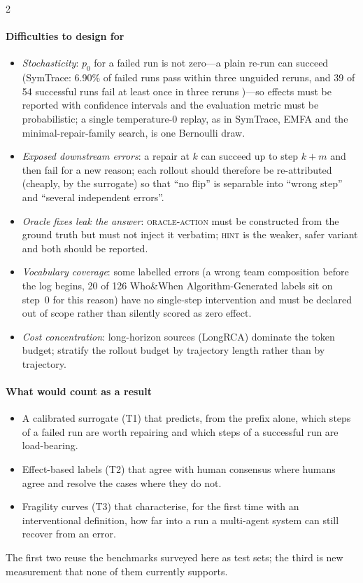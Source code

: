 \begin{multicols}{2}
\paragraph{Difficulties to design for}
\begin{itemize}[leftmargin=1.1em]
\item \emph{Stochasticity}: $p_0$ for a failed run is not zero---a plain re-run can succeed (SymTrace: 6.90\% of failed runs pass within three unguided reruns, and 39 of 54 successful runs fail at least once in three reruns \cite{luan2026symtrace})---so effects must be reported with confidence intervals and the evaluation metric must be probabilistic; a single temperature-0 replay, as in SymTrace, EMFA and the minimal-repair-family search, is one Bernoulli draw.
\item \emph{Exposed downstream errors}: a repair at $k$ can succeed up to step $k+m$ and then fail for a new reason; each rollout should therefore be re-attributed (cheaply, by the surrogate) so that ``no flip'' is separable into ``wrong step'' and ``several independent errors''.
\item \emph{Oracle fixes leak the answer}: \textsc{oracle-action} must be constructed from the ground truth but must not inject it verbatim; \textsc{hint} is the weaker, safer variant and both should be reported.
\item \emph{Vocabulary coverage}: some labelled errors (a wrong team composition before the log begins, 20 of 126 Who\&When Algorithm-Generated labels sit on step~0 for this reason) have no single-step intervention and must be declared out of scope rather than silently scored as zero effect.
\item \emph{Cost concentration}: long-horizon sources (LongRCA) dominate the token budget; stratify the rollout budget by trajectory length rather than by trajectory.
\end{itemize}

\paragraph{What would count as a result}
\begin{itemize}[leftmargin=1.1em]
\item A calibrated surrogate (T1) that predicts, from the prefix alone, which steps of a failed run are worth repairing and which steps of a successful run are load-bearing.
\item Effect-based labels (T2) that agree with human consensus where humans agree and resolve the cases where they do not.
\item Fragility curves (T3) that characterise, for the first time with an interventional definition, how far into a run a multi-agent system can still recover from an error.
\end{itemize}
The first two reuse the benchmarks surveyed here as test sets; the third is new measurement that none of them currently supports.
\end{multicols}

